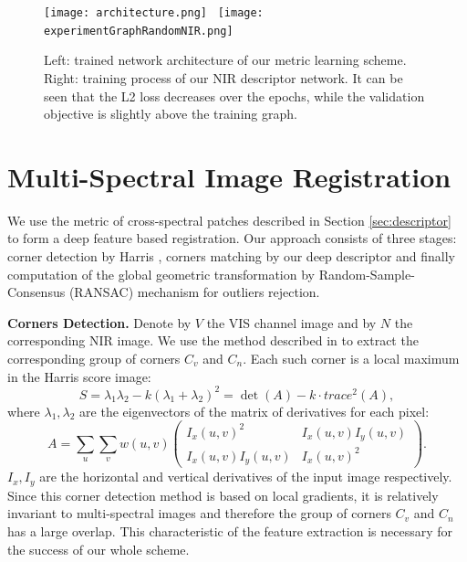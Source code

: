 \documentclass[10pt,twocolumn,letterpaper]{article}
\begin{document}
\begin{figure}
	\centering
	\texttt{[image: architecture.png]}~
	\texttt{[image: experimentGraphRandomNIR.png]}~
	
	\caption{Left: trained network architecture of our metric learning scheme. Right: training process of our NIR descriptor network. It can be seen that the L2 loss decreases over the epochs, while the validation objective is slightly above the training graph.}
	\label{fig:2}       %
\end{figure}


\section{Multi-Spectral Image Registration} \label{sec:registration}

We use the metric of cross-spectral patches described in Section \ref{sec:descriptor} to form a deep feature based registration. Our approach consists of three stages: corner detection by Harris \cite{harris}, corners matching by our deep descriptor and finally computation of the global geometric transformation by Random-Sample-Consensus (RANSAC) \cite{ransac} mechanism for outliers rejection.

\textbf{Corners Detection.}
Denote by $V$ the VIS channel image and by $N$ the corresponding NIR image. We use the method described in \cite{harris} to extract the corresponding group of corners $C_v$ and $C_n$. Each such corner is a local maximum in the Harris score image:
\begin{equation}
S = \lambda_1\lambda_2-k(\lambda_1+\lambda_2)^2 = \det(A)-k\cdot trace^2(A),
\end{equation}
where $\lambda_1,\lambda_2$ are the eigenvectors of the matrix of derivatives for each pixel: 
\begin{equation} \label{eq:harrisMatrix}
A = \sum_u \sum_v w(u,v)
\begin{pmatrix}
I_x(u,v)^2 & I_x(u,v)I_y(u,v) \\ 
I_x(u,v)I_y(u,v) & I_x(u,v)^2
\end{pmatrix}.
\end{equation}
$I_x,I_y$ are the horizontal and vertical derivatives of the input image respectively. Since this corner detection method is based on local gradients, it is relatively invariant to multi-spectral images and therefore the group of corners $C_v$ and $C_n$ has a large overlap. This characteristic of the feature extraction is necessary for the success of our whole scheme.
\end{document}
